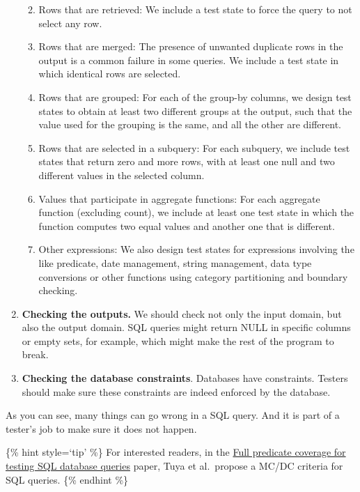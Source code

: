 \begin{enumerate}
  \begin{enumerate}
  \def\labelenumii{\arabic{enumii}.}
  \tightlist
  \item
    Rows that are retrieved: We include a test state to force the query
    to not select any row.
  \item
    Rows that are merged: The presence of unwanted duplicate rows in the
    output is a common failure in some queries. We include a test state
    in which identical rows are selected.
  \item
    Rows that are grouped: For each of the group-by columns, we design
    test states to obtain at least two different groups at the output,
    such that the value used for the grouping is the same, and all the
    other are different.
  \item
    Rows that are selected in a subquery: For each subquery, we include
    test states that return zero and more rows, with at least one null
    and two different values in the selected column.
  \item
    Values that participate in aggregate functions: For each aggregate
    function (excluding count), we include at least one test state in
    which the function computes two equal values and another one that is
    different.
  \item
    Other expressions: We also design test states for expressions
    involving the like predicate, date management, string management,
    data type conversions or other functions using category partitioning
    and boundary checking.
  \end{enumerate}
\item
  \textbf{Checking the outputs.} We should check not only the input
  domain, but also the output domain. SQL queries might return NULL in
  specific columns or empty sets, for example, which might make the rest
  of the program to break.
\item
  \textbf{Checking the database constraints}. Databases have
  constraints. Testers should make sure these constraints are indeed
  enforced by the database.
\end{enumerate}

As you can see, many things can go wrong in a SQL query. And it is part
of a tester's job to make sure it does not happen.

\{\% hint style=`tip' \%\} For interested readers, in the
\href{https://onlinelibrary.wiley.com/doi/abs/10.1002/stvr.424}{Full
predicate coverage for testing SQL database queries} paper, Tuya et
al.~propose a MC/DC criteria for SQL queries. \{\% endhint \%\}

